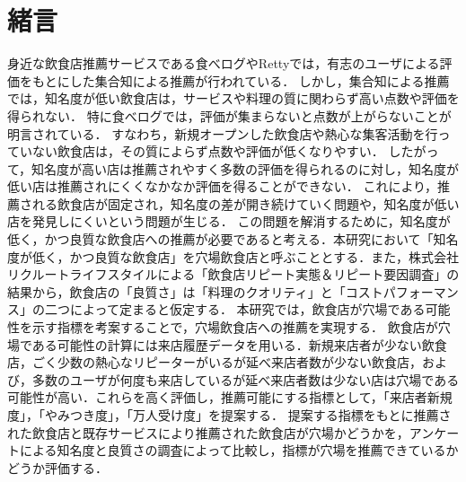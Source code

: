 \chapter{緒言}
\label{chap:intro}
身近な飲食店推薦サービスである食べログ\footnotemark{}やRetty\footnotemark{}では，有志のユーザによる評価をもとにした集合知による推薦が行われている．
しかし，集合知による推薦では，知名度が低い飲食店は，サービスや料理の質に関わらず高い点数や評価を得られない．
特に食べログでは，評価が集まらないと点数が上がらないことが明言されている\cite{score}．
すなわち，新規オープンした飲食店や熱心な集客活動を行っていない飲食店は，その質によらず点数や評価が低くなりやすい．
したがって，知名度が高い店は推薦されやすく多数の評価を得られるのに対し，知名度が低い店は推薦されにくくなかなか評価を得ることができない．
これにより，推薦される飲食店が固定され，知名度の差が開き続けていく問題や，知名度が低い店を発見しにくいという問題が生じる．
この問題を解消するために，知名度が低く，かつ良質な飲食店への推薦が必要であると考える．本研究において「知名度が低く，かつ良質な飲食店」を穴場飲食店と呼ぶこととする．また，株式会社リクルートライフスタイルによる「飲食店リピート実態＆リピート要因調査」\cite{repeat}の結果から，飲食店の「良質さ」は「料理のクオリティ」と「コストパフォーマンス」の二つによって定まると仮定する．
本研究では，飲食店が穴場である可能性を示す指標を考案することで，穴場飲食店への推薦を実現する．
飲食店が穴場である可能性の計算には来店履歴データを用いる．新規来店者が少ない飲食店，ごく少数の熱心なリピーターがいるが延べ来店者数が少ない飲食店，および，多数のユーザが何度も来店しているが延べ来店者数は少ない店は穴場である可能性が高い．これらを高く評価し，推薦可能にする指標として，「来店者新規度」，「やみつき度」，「万人受け度」を提案する．
提案する指標をもとに推薦された飲食店と既存サービスにより推薦された飲食店が穴場かどうかを，アンケートによる知名度と良質さの調査によって比較し，指標が穴場を推薦できているかどうか評価する．
